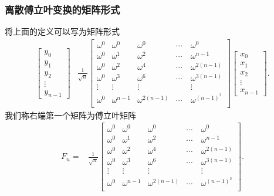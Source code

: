 \documentclass[10pt]{beamer}
\begin{document}
\begin{frame}
\frametitle{离散傅立叶变换的矩阵形式}
将上面的定义可以写为矩阵形式
\begin{align*}
\left[ \begin{array}{c}
     y_0 \\ y_1 \\y_2 \\ \vdots \\ y_{n-1}  \end{array} \right]
& \frac{1}{\sqrt{n}} \left[ \begin{array}{ccccc}
     \omega^0    &  \omega^0 &  \omega^0 & \cdots &  \omega^0  \\
     \omega^0    &  \omega^1 &  \omega^2 & \cdots &  \omega^{n-1}  \\
     \omega^0    &  \omega^2 &  \omega^4 & \cdots &  \omega^{2(n-1)}  \\
     \omega^0    &  \omega^3 &  \omega^6 & \cdots &  \omega^{3(n-1)}  \\
     \vdots    &  \vdots & \vdots &\quad &  \vdots  \\
     \omega^0    &  \omega^{n-1} &  \omega^{2(n-1)} & \cdots &  \omega^{(n-1)^2}  \\                   
            \end{array} \right] 
\left[ \begin{array}{c}
     x_0 \\ x_1 \\ x_2 \\ \vdots \\ x_{n-1}  \end{array} \right].
\end{align*}
我们称右端第一个矩阵为傅立叶矩阵
\begin{align}
F_n = & \frac{1}{\sqrt{n}} \left[ \begin{array}{ccccc}
     \omega^0    &  \omega^0 &  \omega^0 & \cdots &  \omega^0  \\
     \omega^0    &  \omega^1 &  \omega^2 & \cdots &  \omega^{n-1}  \\
     \omega^0    &  \omega^2 &  \omega^4 & \cdots &  \omega^{2(n-1)}  \\
     \omega^0    &  \omega^3 &  \omega^6 & \cdots &  \omega^{3(n-1)}  \\
     \vdots    &  \vdots & \vdots &\quad &  \vdots  \\
     \omega^0    &  \omega^{n-1} &  \omega^{2(n-1)} & \cdots &  \omega^{(n-1)^2}  \\                   
            \end{array} \right] .
\end{align}
\end{frame}
\end{document}
